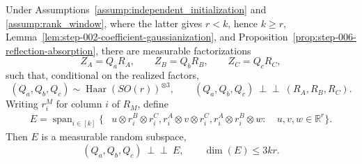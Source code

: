 \begin{proposition}
\label{prop:step-006-product-shape}
\leavevmode\par\noindent
Under Assumptions~\ref{assump:independent_initialization} and
\ref{assump:rank_window}, where the latter gives \(r<k\), hence \(k\ge r\),
Lemma~\ref{lem:step-002-coefficient-gaussianization}, and
Proposition~\ref{prop:step-006-reflection-absorption}, there are measurable
factorizations
\begin{equation}
  Z_A=Q_aR_A,\qquad Z_B=Q_bR_B,\qquad Z_C=Q_cR_C,              \label{eq:step-006-16}
\end{equation}
such that, conditional on the realized factors,
\begin{equation}
  (Q_a,Q_b,Q_c)\sim
  \operatorname{Haar}(SO(r))^{\otimes3},
  \qquad
  (Q_a,Q_b,Q_c)\ \perp\!\!\!\perp\ (R_A,R_B,R_C).           \label{eq:step-006-17}
\end{equation}
Writing \(r_i^M\) for column \(i\) of \(R_M\), define
\begin{equation}
\begin{aligned}
  E=\operatorname{span}_{i\in[k]}\{&
    u\otimes r_i^B\otimes r_i^C,
    r_i^A\otimes v\otimes r_i^C,
    r_i^A\otimes r_i^B\otimes w:\
   &u,v,w\in\mathbb R^r\}.
\end{aligned}\label{eq:step-006-18}
\end{equation}
Then \(E\) is a measurable random subspace,
\begin{equation}
  (Q_a,Q_b,Q_c)\ \perp\!\!\!\perp\ E,
  \qquad \boxed{\dim(E)\le3kr}.                              \label{eq:step-006-19}
\end{equation}

\end{proposition}

